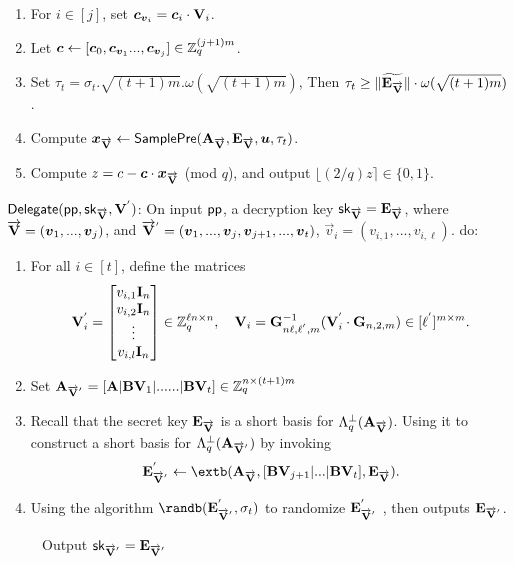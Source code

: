 \begin{enumerate}
\item For $i \in [j]$, set $\boldsymbol{c}_{\boldsymbol{v}_{i}}=\boldsymbol{c}_{i}\cdot \mathbf{V}_{i}$.
\item Let $\boldsymbol{c} \leftarrow [\boldsymbol{c}_{0},\boldsymbol{c}_{\boldsymbol{v}_{1}}...,\boldsymbol{c}_{\boldsymbol{v}_{j}}] \in \mathbb{Z}^{(j+1)m}_{q}$.
\item Set $\tau_{t}=\sigma_{t}.\sqrt{(t+1)m}.\omega(\sqrt{(t+1)m})$, Then $\tau_{t}\geq \| \widetilde{\mathbf{E}_{\overrightarrow{\mathbf{V}}}} \|\cdot \omega(\sqrt{(t+1)m})$.
\item Compute $\boldsymbol{x}_{\overrightarrow{\mathbf{V}}} \leftarrow \mathsf{SamplePre}(\mathbf{A}_{\overrightarrow{\mathbf{V}}}, \mathbf{E}_{\overrightarrow{\mathbf{V}}}, \boldsymbol{u}, \tau_{t})$.
\item Compute $z=c-\boldsymbol{c}\cdot \boldsymbol{x}_{\overrightarrow{\mathbf{V}}}$ (mod $q$), and output $\lfloor (2/q)z \rceil \in \{0,1\}$.
\end{enumerate}
$\mathsf{Delegate}(\mathsf{pp}, \mathsf{sk}_{\overrightarrow{\mathbf{V}}}, \mathbf{V}^{'})$: On input $\mathsf{pp}$, a decryption key $\mathsf{sk}_{\overrightarrow{\mathbf{V}}}=\mathbf{E}_{\overrightarrow{\mathbf{V}}}$, where $\overrightarrow{\mathbf{V}}=(\boldsymbol{v}_{1},...,\boldsymbol{v}_{j})$, and $\overrightarrow{\mathbf{V}}^{'}=(\boldsymbol{v}_{1},...,\boldsymbol{v}_{j},\boldsymbol{v}_{j+1},...,\boldsymbol{v}_{t})$, $\vec{v}_{i}=(v_{i,1},...,v_{i,\ell})$. do:
\begin{enumerate}
\item For all $i \in [t]$, define the matrices
\begin{equation}
 \mathbf{V}^{'}_{i}= \begin{bmatrix}
v_{i,1} \mathbf{I}_{n}\\
v_{i,2} \mathbf{I}_{n}\\
\vdots\\
v_{i,l} \mathbf{I}_{n}
\end{bmatrix} \in \mathbb{Z}^{\ell n \times n}_{q},~~~ \mathbf{V}_{i}=\mathbf{G}^{-1}_{n\ell,\ell^{'},m}(\mathbf{V}^{'}_{i}\cdot \mathbf{G}_{n,2,m}) \in [\ell^{'}]^{m \times m}.
\end{equation}
\item Set $\mathbf{A}_{\overrightarrow{\mathbf{V}}^{'}}=[\mathbf{A} | \mathbf{B}\mathbf{V}_{1}| ...... | \mathbf{B}\mathbf{V}_{t}] \in \mathbb{Z}^{n \times (t+1)m}_{q}$
\item Recall that the secret key $\mathbf{E}_{\overrightarrow{\mathbf{V}}}$ is a short basis for $\Lambda^{\perp}_{q}(\mathbf{A}_{\overrightarrow{\mathbf{V}}})$. Using it to construct a short basis for $\Lambda^{\perp}_{q}(\mathbf{A}_{\overrightarrow{\mathbf{V}}^{'}})$ by invoking
\begin{equation}
\mat{E}^{'}_{\overrightarrow{\mat{V}}^{'}} \leftarrow \extb ( \mat{A}_{\overrightarrow{\mat{V}}}, [\mat{B}\mat{V}_{j+1}|...|\mat{B}\mat{V}_{t}], \mat{E}_{\overrightarrow{\mat{V}}} ).
\end{equation}
\item Using the algorithm $\randb(\mat{E}^{'}_{\overrightarrow{\mat{V}}^{'}}, \sigma_{t})$ to randomize $\mathbf{E}^{'}_{\overrightarrow{\mathbf{V}}^{'}}$ , then outputs $\mathbf{E}_{\overrightarrow{\mathbf{V}}^{'}}$.
\end{enumerate}
~~~~~Output $\mathsf{sk}_{\overrightarrow{\mathbf{V}}^{'}}=\mathbf{E}_{\overrightarrow{\mathbf{V}}^{'}}$

